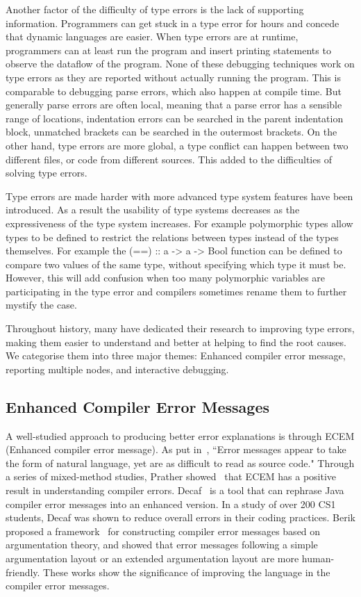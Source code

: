 Another factor of the difficulty of type errors is the lack of supporting information. Programmers can get stuck in a type error for hours and concede that dynamic languages are easier. When type errors are at runtime, programmers can at least run the program and insert printing statements to observe the dataflow of the program. None of these debugging techniques work on type errors as they are reported without actually running the program.  This is  comparable to debugging parse errors, which also happen at compile time. But generally parse errors are often local, meaning that a parse error has a sensible range of locations,  indentation errors can be searched in the parent indentation block, unmatched brackets can be searched in the outermost brackets. On the other hand, type errors are more global, a type conflict can happen between two different files, or code from different sources. This added to the difficulties of solving type errors.
 

Type errors are made harder with more advanced type system features have been introduced. As a result the usability of type systems decreases as the expressiveness of the type system increases. For example polymorphic types allow types to be defined to restrict the relations between types instead of the types themselves. For example the (==) :: a -> a -> Bool function can be defined to compare two values of the same type, without specifying which type it must be. However, this will add confusion when too many polymorphic variables are participating in the type error and compilers sometimes rename them to further mystify the case.


Throughout history, many have dedicated their research to improving type errors, making them easier to understand and better at helping to find the root causes. We categorise them into three major themes: Enhanced compiler error message, reporting multiple nodes, and interactive debugging.

\subsection{Enhanced Compiler Error Messages}

A well-studied approach to producing better error explanations is through ECEM (Enhanced compiler error message).  As put in~\cite{Barik2017-gy}, ``Error messages appear to take the form of natural language, yet are as difficult to read as source code."   Through a series of mixed-method studies, Prather showed~\cite{Prather2017-dg} that ECEM has a positive result in understanding compiler errors. Decaf~\cite{Becker2016-kc} is a tool that can rephrase Java compiler error messages into an enhanced version. In a study of over 200 CS1 students, Decaf was shown to reduce overall errors in their coding practices. Berik proposed a framework~\cite{Barik2018-xs} for constructing compiler error messages based on argumentation theory, and showed that error messages following a simple argumentation layout or an extended argumentation layout are more human-friendly.  These works show the significance of improving the language in the compiler error messages. 


